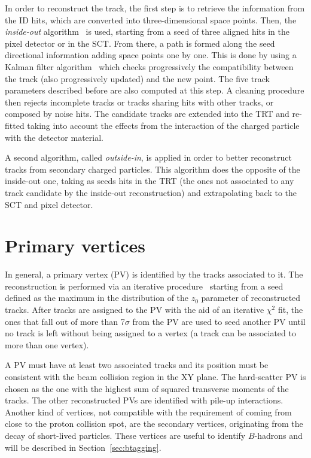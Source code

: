 In order to reconstruct the track, the first step is to retrieve the information from
the ID hits, which are converted into three-dimensional space points. Then, 
the {\it inside-out} algorithm~\cite{Cornelissen:1020106} is used, starting from a
seed of three aligned hits in the pixel detector or in the SCT.
From there, a path is formed along the seed directional information adding
space points one by one. This is done by using a Kalman filter algorithm~\cite{Frühwirth1987444}
which checks progressively the compatibility between the track (also progressively updated)
and the new point. The five track parameters described before are also computed at this step.
A cleaning procedure then 
rejects incomplete tracks or tracks sharing hits with other tracks,
or composed by %
noise hits. The candidate tracks are extended
into the TRT and re-fitted taking into account the effects from the interaction
of the charged particle with the detector material. 

A second algorithm, called {\it outside-in}, is applied in order to better
reconstruct tracks from secondary charged particles. This algorithm does
the opposite of the inside-out one, taking as seeds hits in the TRT (the
ones not associated to any track candidate by the inside-out reconstruction)
and extrapolating back to the SCT and pixel detector.


\section{Primary vertices}\label{sec:primaryvertex}

In general, a primary vertex (PV) is identified by the tracks associated to it.
The reconstruction is performed via an iterative procedure~\cite{ATLAS-CONF-2010-069}
starting from a seed defined as the maximum in the distribution of the $z_0$ parameter
of reconstructed tracks. After tracks are assigned to the PV with the aid of an
iterative $\chi^2$ fit, the ones that fall out of more than 7$\sigma$ from the PV
are used to seed another PV until no track is left without being assigned to a vertex
(a track can be associated to more than one vertex).

A PV must have at least two associated tracks and its position must be consistent with 
the beam collision region in the XY plane. The hard-scatter PV is chosen as the one
with the highest sum of squared transverse moments of the tracks. The other reconstructed PVs 
are identified with pile-up interactions. Another kind of vertices, not
compatible with the requirement of coming from close to the proton collision spot,
are the secondary vertices, originating from the decay of short-lived particles.
These vertices are useful to identify $B$-hadrons and will be described in Section~\ref{sec:btagging}.

